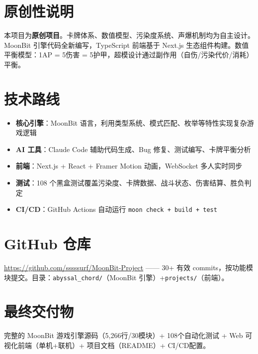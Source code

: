 \documentclass[10pt,a4paper]{article}
\begin{document}
\section{原创性说明}
本项目为\textbf{原创项目}。卡牌体系、数值模型、污染度系统、声爆机制均为自主设计。MoonBit 引擎代码全新编写，TypeScript 前端基于 Next.js 生态组件构建。数值平衡模型：1AP = 5伤害 = 5护甲，超模设计通过副作用（自伤/污染代价/消耗）平衡。

\section{技术路线}
\begin{itemize}[leftmargin=*,nosep]
  \item \textbf{核心引擎}：MoonBit 语言，利用类型系统、模式匹配、枚举等特性实现复杂游戏逻辑
  \item \textbf{AI 工具}：Claude Code 辅助代码生成、Bug 修复、测试编写、卡牌平衡分析
  \item \textbf{前端}：Next.js + React + Framer Motion 动画，WebSocket 多人实时同步
  \item \textbf{测试}：108 个黑盒测试覆盖污染度、卡牌数据、战斗状态、伤害结算、胜负判定
  \item \textbf{CI/CD}：GitHub Actions 自动运行 \texttt{moon check + build + test}
\end{itemize}

\vspace{4pt}
\section{GitHub 仓库}
\url{https://github.com/sssssurf/MoonBit-Project} —— 30+ 有效 commits，按功能模块提交。目录：\texttt{abyssal\_chord/}（MoonBit 引擎）+\texttt{projects/}（前端）。

\section{最终交付物}
完整的 MoonBit 游戏引擎源码（5,266行/30模块）+ 108个自动化测试 + Web 可视化前端（单机+联机）+ 项目文档（README）+ CI/CD配置。
\end{document}
